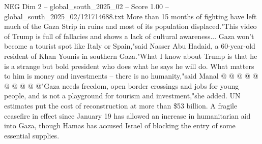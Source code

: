 \begin{textsample}{NEG Dim 2 – global\_south\_2025\_02 – Score 1.00 – global\_south\_2025\_02/121714688.txt}
More than 15 months of fighting have left much of the Gaza Strip in ruins and most of its population displaced."This video of Trump is full of fallacies and shows a lack of cultural awareness...
Gaza won't become a tourist spot like Italy or Spain,"said Nasser Abu Hadaid, a 60-year-old resident of Khan Younis in southern Gaza."What I know about Trump is that he is a strange but bold president who does what he says he will do.
What matters to him is money and investments -- there is no humanity,"said Manal @ @ @ @ @ @ @ @ @ @"Gaza needs freedom, open border crossings and jobs for young people, and is not a playground for tourism and investment,"she added.
UN estimates put the cost of reconstruction at more than \$53 billion.
A fragile ceasefire in effect since January 19 has allowed an increase in humanitarian aid into Gaza, though Hamas has accused Israel of blocking the entry of some essential supplies.

\end{textsample}
